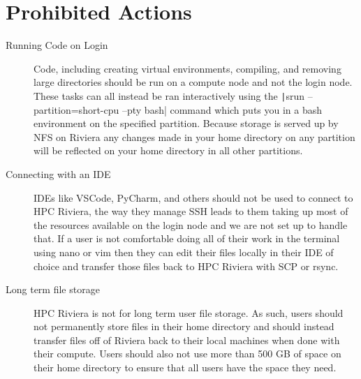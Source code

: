\documentclass[11pt,letterpaper]{article}
\begin{document}
\section{Prohibited Actions}
\begin{description}
    \item[Running Code on Login] Code, including creating virtual environments, compiling, and removing large directories should be run on a compute node and not the login node. These tasks can all instead be ran interactively using the \texttt|srun --partition=short-cpu --pty bash| command which puts you in a bash environment on the specified partition. Because storage is served up by NFS on Riviera any changes made in your home directory on any partition will be reflected on your home directory in all other partitions.
    \item[Connecting with an IDE] IDEs like VSCode, PyCharm, and others should not be used to connect to HPC Riviera, the way they manage SSH leads to them taking up most of the resources available on the login node and we are not set up to handle that. If a user is not comfortable doing all of their work in the terminal using nano or vim then they can edit their files locally in their IDE of choice and transfer those files back to HPC Riviera with SCP or rsync.
    \item[Long term file storage] HPC Riviera is not for long term user file storage. As such, users should not permanently store files in their home directory and should instead transfer files off of Riviera back to their local machines when done with their compute. Users should also not use more than 500 GB of space on their home directory to ensure that all users have the space they need.  
\end{description}
\end{document}

